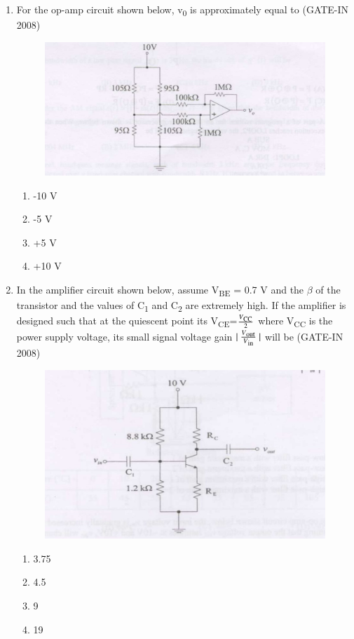 \documentclass[journal,12pt,onecolumn]{IEEEtran}
\theoremstyle{remark}
\begin{document}
\begin{enumerate}[label=Q.\arabic*,start=1]
    \item  For the op-amp circuit shown below, v\textsubscript{0} is approximately equal to (GATE-IN 2008)
    \begin{figure}[H]
    \centering
    \includegraphics[width=0.5\columnwidth]{figs/i21.jpg}
    \caption{}
    \label{fig:placeholder21}
\end{figure}
\begin{multicols}{4}
    \begin{enumerate} 
        \item -10 V
        \item  -5 V
        \item  +5 V
        \item +10 V
    \end{enumerate}
    \end{multicols}
    
    \item  In the amplifier circuit shown below, assume V\textsubscript{BE} = 0.7 V and the $\beta$ of the transistor and the values
of C\textsubscript{1} and C\textsubscript{2} are extremely high. If the amplifier is designed such that at the quiescent point its V\textsubscript{CE}=\(\frac{V\textsubscript{CC}}{2}\) where V\textsubscript{CC}  is the power supply voltage, its small signal voltage gain $\lvert \ \frac{V\textsubscript{out}}{V\textsubscript{in}}\  \rvert$ will be (GATE-IN 2008)
\begin{figure}[H]
    \centering
    \includegraphics[width=0.5\columnwidth]{figs/i22.jpg}
    \caption{}
    \label{fig:placeholder22}
\end{figure}
\begin{multicols}{4}
    \begin{enumerate} 
        \item 3.75
        \item  4.5
        \item  9
        \item 19
    \end{enumerate}
    \end{multicols}
    

\end{enumerate}
\end{document}

